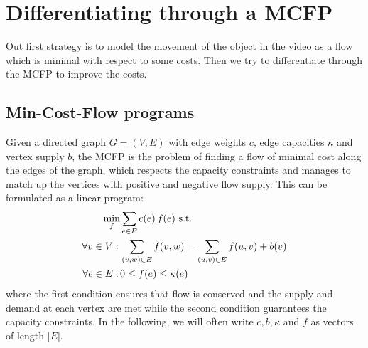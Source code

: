 \documentclass{article}
\begin{document}
\section{Differentiating through a MCFP}
Out first strategy is to model the movement of the object in the video as a flow which is minimal with respect to some costs. Then we try to differentiate through the MCFP to improve the costs.
\subsection{Min-Cost-Flow programs}
Given a directed graph $G=(V,E)$ with edge weights $c$, edge capacities $\kappa$ and vertex supply $b$, the MCFP is the problem of finding a flow of minimal cost along the edges of the graph, which respects the capacity constraints and manages to match up the vertices with positive and negative flow supply. This can be formulated as a linear program:
\begin{align}\label{MCFP}
\min_f &\sum_{e \in E} c(e)\,f(e) \textnormal{ s.t.}\nonumber\\
\forall v \in V: \,&\sum_{(v,w) \in E} f(v,w) = \sum_{(u,v) \in E} f(u,v) + b(v) \\
\forall	e \in E: \,&0 \leq f(e) \leq \kappa(e) \nonumber
\end{align}
where the first condition ensures that flow is conserved and the supply and demand at each vertex are met while the second condition guarantees the capacity constraints. In the following, we will often write $c, b, \kappa$ and $f$ as vectors of length $|E|$.
\end{document}
